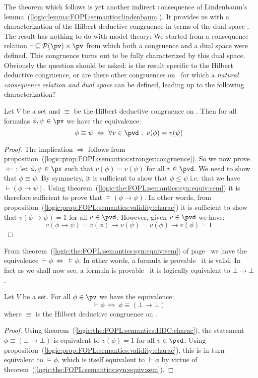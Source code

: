 The theorem which follows is yet another indirect consequence of
Lindenbaum's lemma~(\ref{logic:lemma:FOPL:semantics:lindenbaum}). It
provides us with a characterization of the Hilbert deductive
congruence in terms of the dual space \pvd. The result has nothing
to do with model theory: We started from a consequence relation
$\vdash\,\subseteq{\cal P}(\pv)\times\pv$ from which both a
congruence and a dual space were defined. This congruence turns out
to be fully characterized by this dual space. Obviously the question
should be asked: is the result specific to the Hilbert deductive
congruence, or are there other congruences on \pv\ for which a {\em
natural consequence relation and dual space} can be defined, leading
up to the following characterization?

\begin{theorem}\label{logic:the:FOPL:semantics:HDC:charac}
Let $V$ be a set and $\equiv$ be the Hilbert deductive congruence on
\pv. Then for all formulas $\phi,\psi\in\pv$ we have the
equivalence:
    \[
    \phi\equiv\psi\ \Leftrightarrow\ \forall v\in\pvd\ ,\
    v(\phi)=v(\psi)
    \]
\end{theorem}
\begin{proof}
The implication $\Rightarrow$ follows from
proposition~(\ref{logic:prop:FOPL:semantics:stronger:congruence}).
So we now prove $\Leftarrow$\,: let $\phi,\psi\in\pv$ such that
$v(\phi)=v(\psi)$ for all $v\in\pvd$. We need to show that
$\phi\equiv\psi$. By symmetry, it is sufficient to show that
$\phi\leq\psi$ i.e. that we have $\vdash(\phi\to\psi)$. Using
theorem~(\ref{logic:the:FOPL:semantics:syn:equiv:sem}) it is
therefore sufficient to prove that $\vDash(\phi\to\psi)$. In other
words, from
proposition~(\ref{logic:prop:FOPL:semantics:validity:charac}) it is
sufficient to show that $v(\phi\to\psi)=1$ for all $v\in\pvd$.
However, given $v\in\pvd$ we have:
    \[
    v(\phi\to\psi)=v(\phi)\to v(\psi)=v(\phi)\to v(\phi)=1
    \]
\end{proof}

From theorem~(\ref{logic:the:FOPL:semantics:syn:equiv:sem}) of
page~\pageref{logic:the:FOPL:semantics:syn:equiv:sem} we have the
equivalence $\vdash\phi\ \Leftrightarrow\ \vDash\phi$. In other
words, a formula is provable \ifand\ it is valid. In fact as we
shall now see, a formula is provable \ifand\ it is logically
equivalent to $\bot\to\bot$.

\begin{prop}\label{logic:prop:FOPL:semantics:provable:charac}
Let $V$ be a set. For all $\phi\in\pv$ we have the equivalence:
    \[
    \vdash\phi\ \Leftrightarrow\ \phi\equiv(\bot\to\bot)
    \]
where $\equiv$ is the Hilbert deductive congruence on \pv.
\end{prop}
\begin{proof}
Using theorem~(\ref{logic:the:FOPL:semantics:HDC:charac}), the
statement $\phi\equiv(\bot\to\bot)$ is equivalent to $v(\phi)=1$ for
all $v\in\pvd$. Using
proposition~(\ref{logic:prop:FOPL:semantics:validity:charac}), this
is in turn equivalent to $\vDash\phi$, which is itself equivalent to
$\vdash\phi$ by virtue of
theorem~(\ref{logic:the:FOPL:semantics:syn:equiv:sem}).
\end{proof}

